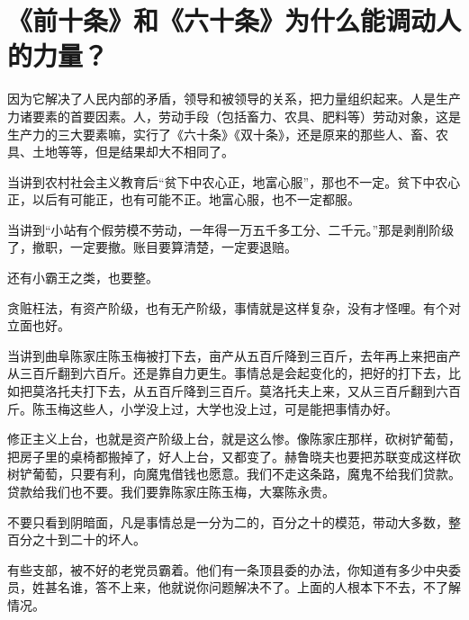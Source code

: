 \section[《前十条》和《六十条》为什么能调动人的力量？（一九六四年）]{《前十条》和《六十条》为什么能调动人的力量？}


因为它解决了人民内部的矛盾，领导和被领导的关系，把力量组织起来。人是生产力诸要素的首要因素。人，劳动手段（包括畜力、农具、肥料等）劳动对象，这是生产力的三大要素嘛，实行了《六十条》《双十条》，还是原来的那些人、畜、农具、土地等等，但是结果却大不相同了。

当讲到农村社会主义教育后“贫下中农心正，地富心服”，那也不一定。贫下中农心正，以后有可能正，也有可能不正。地富心服，也不一定都服。

当讲到“小站有个假劳模不劳动，一年得一万五千多工分、二千元。”那是剥削阶级了，撤职，一定要撤。账目要算清楚，一定要退赔。

还有小霸王之类，也要整。

贪赃枉法，有资产阶级，也有无产阶级，事情就是这样复杂，没有才怪哩。有个对立面也好。

当讲到曲阜陈家庄陈玉梅被打下去，亩产从五百斤降到三百斤，去年再上来把亩产从三百斤翻到六百斤。还是靠自力更生。事情总是会起变化的，把好的打下去，比如把莫洛托夫打下去，从五百斤降到三百斤。莫洛托夫上来，又从三百斤翻到六百斤。陈玉梅这些人，小学没上过，大学也没上过，可是能把事情办好。

修正主义上台，也就是资产阶级上台，就是这么惨。像陈家庄那样，砍树铲葡萄，把房子里的桌椅都搬掉了，好人上台，又都变了。赫鲁晓夫也要把苏联变成这样砍树铲葡萄，只要有利，向魔鬼借钱也愿意。我们不走这条路，魔鬼不给我们贷款。贷款给我们也不要。我们要靠陈家庄陈玉梅，大寨陈永贵。

不要只看到阴暗面，凡是事情总是一分为二的，百分之十的模范，带动大多数，整百分之十到二十的坏人。

有些支部，被不好的老党员霸着。他们有一条顶县委的办法，你知道有多少中央委员，姓甚名谁，答不上来，他就说你问题解决不了。上面的人根本下不去，不了解情况。


